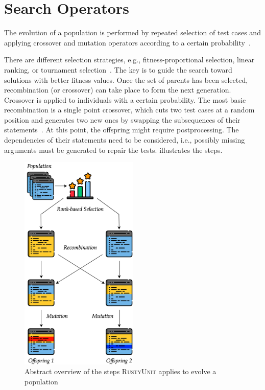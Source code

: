\documentclass[paper=a4,%
  twoside,%
  BCOR4mm,%
  abstract=true,%
  toc=bibliography,%
  chapterprefix=true,%
  toc=bibliographynumbered,%
  open=right,%
  english,%
  pagesize=pdftex]{scrreprt}
\newcommand{\tech}{\textsc{RustyUnit}\xspace}
\begin{document}
\section{Search Operators}
\label{sec:search-operators}
The evolution of a population is performed by repeated selection of test cases and applying crossover and mutation operators according to a certain probability~\cite{Fraser2012}.

There are different selection strategies, e.g., fitness-proportional selection, linear ranking, or tournament selection~\cite{McMinn_2004}. The key is to guide the search toward solutions with better fitness values. Once the set of parents has been selected, recombination (or crossover) can take place to form the next generation. Crossover is applied to individuals with a certain probability. The most basic recombination is a single point crossover, which cuts two test cases at a random position and generates two new ones by swapping the subsequences of their statements~\cite{Fraser2012}. At this point, the offspring might require postprocessing. The dependencies of their statements need to be considered, i.e., possibly missing arguments must be generated to repair the tests.  illustrates the steps.

\begin{figure}[h]
\caption{\label{fig:ga-overview}Abstract overview of the steps \tech applies to evolve a population}
\centering
\includegraphics[width=0.5\textwidth]{ga/ga-overview}
\end{figure}
\end{document}

